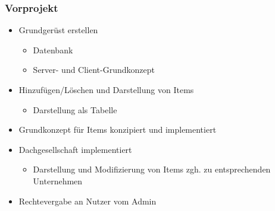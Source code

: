 \documentclass{beamer}
\begin{document}
\begin{frame}
\frametitle{Vorprojekt}

\begin{block}{}
\begin{itemize}
\item Grundgerüst erstellen
\begin{itemize}
\item Datenbank
\item Server- und Client-Grundkonzept
\end{itemize}
\item Hinzufügen/Löschen und Darstellung von Items
\begin{itemize}
\item Darstellung als Tabelle
\end{itemize}
\item Grundkonzept für Items konzipiert und implementiert
\item Dachgesellschaft implementiert
\begin{itemize}
\item Darstellung und Modifizierung von Items zgh. zu entsprechenden Unternehmen
\end{itemize}
\item Rechtevergabe an Nutzer vom Admin
\end{itemize}
\end{block}
\end{frame}
\end{document}
